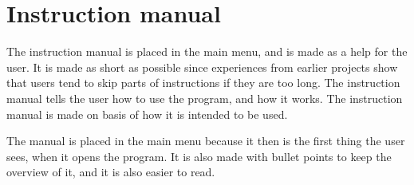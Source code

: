 \section{Instruction manual}
The instruction manual is placed in the main menu, and is made as a help for the user. It is made as short as possible since experiences from earlier projects show that users tend to skip parts of instructions if they are too long. The instruction manual tells the user how to use the program, and how it works. The instruction manual is made on basis of how it is intended to be used.

The manual is placed in the main menu because it then is the first thing the user sees, when it opens the program. It is also made with bullet points to keep the overview of it, and it is also easier to read.